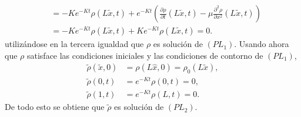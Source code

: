 \documentclass[11pt]{report}
\begin{document}
\begin{solution}
\begin{enumerate}
\begin{align*}
            &=  -Ke^{-Kt}\rho(L\widetilde{x},t) + e^{-Kt}\left(\frac{\partial \rho}{\partial t}(L\widetilde{x},t)-\mu\frac{\partial^2 \rho}{\partial x^2}(L\widetilde{x},t)\right) \\
            &= -Ke^{-Kt}\rho(L\widetilde{x},t) + Ke^{-Kt}\rho(L\widetilde{x},t) = 0.
        \end{align*}
        utilizándose en la tercera igualdad que $\rho$ es solución de $(PL_1)$. Usando ahora que $\rho$ satisface las condiciones iniciales y las condiciones de contorno de $(PL_1)$,
        \begin{align*}
            \widetilde{\rho}(\widetilde{x},0) &= \rho(L\widehat{x},0) = \rho_0(L\widetilde{x}), \\
            \widetilde{\rho}(0,t) &= e^{-Kt}\rho(0,t) = 0, \\
            \widetilde{\rho}(1,t) &= e^{-Kt}\rho(L,t) = 0.
        \end{align*}
        De todo esto se obtiene que $\widetilde{\rho}$ es solución de $(PL_2)$.
        

\end{enumerate}
\end{solution}
\end{document}
